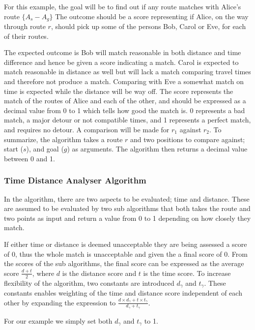 For this example, the goal will be to find out if any route matches with Alice's route $\{A_s-A_g\}$
The outcome should be a score representing if Alice, on the way through route $r$, should pick up some of the persons Bob, Carol or Eve, for each of their routes.

The expected outcome is Bob will match reasonable in both distance and time difference and hence be given a score indicating a match.
Carol is expected to match reasonable in distance as well but will lack a match comparing travel times and therefore not produce a match.
Comparing with Eve a somewhat match on time is expected while the distance will be way off.
The score represents the match of the routes of Alice and each of the other, and should be expressed as a decimal value from 0 to 1 which tells how good the match is.
0 represents a bad match, a major detour or not compatible times, and 1 represents a perfect match, and requires no detour.
A comparison will be made for $r_1$ against $r_2$.
To summarize, the algorithm takes a route $r$ and two positions to compare against; start ($s$), and goal ($g$) as arguments.
The algorithm then returns a decimal value between 0 and 1.

\subsubsection{Time Distance Analyser Algorithm}

In the algorithm, there are two aspects to be evaluated; time and distance.
These are assumed to be evaluated by two sub algorithms that both takes the route and two points as input and return a value from 0 to 1 depending on how closely they match.

If either time or distance is deemed unacceptable they are being assessed a score of 0, thus the whole match is unacceptable and given the a final score of 0.
From the scores of the sub algorithms, the final score can be expressed as the average score $\frac{d+t}{2}$, where $d$ is the distance score and $t$ is the time score.
To increase flexibility of the algorithm, two constants are introduced $d_\gamma$ and $t_\gamma$.
These constants enables weighting of the time and distance score independent of each other by expanding the expression to $\frac{d\times d_\gamma+t\times t_\gamma}{d_\gamma+t_\gamma}$.

For our example we simply set both $d_\gamma$ and $t_\gamma$ to 1. 


